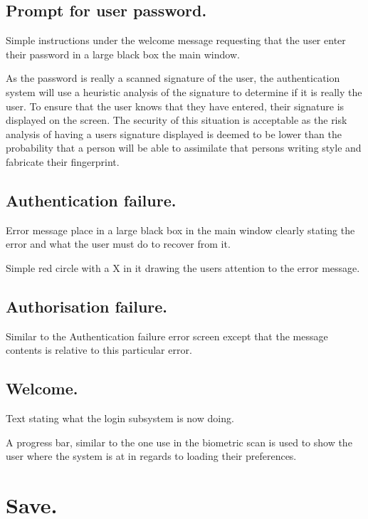 \subsection{Prompt for user password.}

Simple instructions under the welcome message requesting that the user enter their password in a large black box the main window.

As the password is really a scanned signature of the user, the authentication system will use a heuristic analysis of the signature to determine if it is really the user. To ensure that the user knows that they have entered, their signature is displayed on the screen. The security of this situation is acceptable as the risk analysis of having a users signature displayed is deemed to be lower than the probability that a person will be able to assimilate that persons writing style and fabricate their fingerprint.

\subsection{Authentication failure.}

Error message place in a large black box in the main window clearly stating the error and what the user must do to recover from it.

Simple red circle with a X in it drawing the users attention to the error message.

\subsection{Authorisation failure.}

Similar to the Authentication failure error screen except that the message contents is relative to this particular error.

\subsection{Welcome.}

Text stating what the login subsystem is now doing.

A progress bar, similar to the one use in the biometric scan is used to show the user where the system is at in regards to loading their preferences.

\section{Save.}

